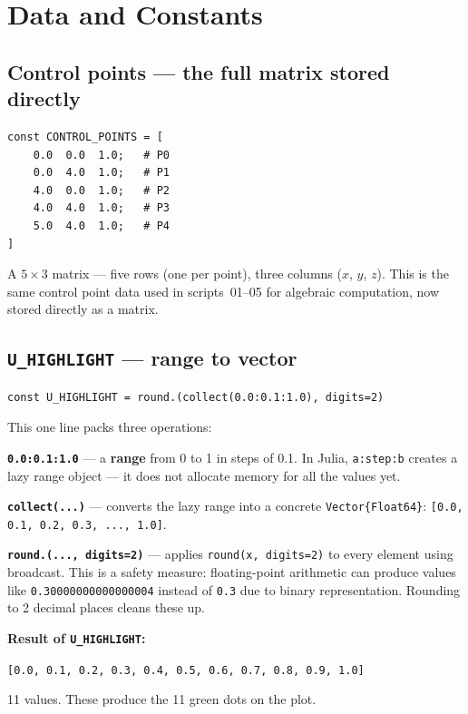 \documentclass[12pt, a4paper]{article}
\newcommand{\cd}[1]{\texttt{#1}}
\begin{document}
\section{Data and Constants}

\subsection{Control points --- the full matrix stored directly}

\begin{verbatim}
const CONTROL_POINTS = [
    0.0  0.0  1.0;   # P0
    0.0  4.0  1.0;   # P1
    4.0  0.0  1.0;   # P2
    4.0  4.0  1.0;   # P3
    5.0  4.0  1.0;   # P4
]
\end{verbatim}

A $5 \times 3$ matrix --- five rows (one per point),
three columns ($x$, $y$, $z$).
This is the same control point data used in scripts~01--05
for algebraic computation, now stored directly as a matrix.

\subsection{\texttt{U\_HIGHLIGHT} --- range to vector}

\begin{verbatim}
const U_HIGHLIGHT = round.(collect(0.0:0.1:1.0), digits=2)
\end{verbatim}

This one line packs three operations:

\textbf{\cd{0.0:0.1:1.0}} --- a \textbf{range} from 0 to 1
in steps of 0.1.
In Julia, \cd{a:step:b} creates a lazy range object ---
it does not allocate memory for all the values yet.

\textbf{\cd{collect(...)}} --- converts the lazy range
into a concrete \cd{Vector\{Float64\}}:
\cd{[0.0, 0.1, 0.2, 0.3, ..., 1.0]}.

\textbf{\cd{round.(..., digits=2)}} --- applies
\cd{round(x, digits=2)} to every element using broadcast.
This is a safety measure: floating-point arithmetic can
produce values like \cd{0.30000000000000004} instead of
\cd{0.3} due to binary representation.
Rounding to 2 decimal places cleans these up.

\begin{examplebox}
\textbf{Result of \cd{U\_HIGHLIGHT}:}

\cd{[0.0, 0.1, 0.2, 0.3, 0.4, 0.5, 0.6, 0.7, 0.8, 0.9, 1.0]}

11 values. These produce the 11 green dots on the plot.
\end{examplebox}
\end{document}
